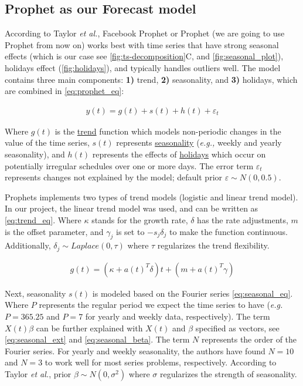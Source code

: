 \subsection[Prophet as our Forecast model]{Prophet as our Forecast model}
\label{sec:forecast_model}

According to Taylor \textit{et al.}\autocite{taylor2018forecasting}, Facebook Prophet or Prophet (we are going to use Prophet from now on)  works best with time series that have strong seasonal effects (which is our case see \autoref{fig:ts-decomposition}C, and \autoref{fig:seasonal_plot}), holidays effect (\autoref{fig:holidays}), and typically handles outliers well. The model contains three main components: \textbf{1)} trend, \textbf{2)} seasonality, and \textbf{3)} holidays, which are combined in \autoref{eq:prophet_eq}:

\begin{align}\label{eq:prophet_eq}
y(t)= g(t) + s(t) + h(t) + \varepsilon_t  
\end{align}

Where $g(t)$ is the \underline{trend} function which models non-periodic changes in the value of the time series, $s(t)$ represents \underline{seasonality} (\textit{e.g.,} weekly and yearly seasonality), and $h(t)$ represents the effects of \underline{holidays} which occur on potentially irregular schedules over one or more days. The error term $\varepsilon_t$ represents changes not explained by the model; default prior $\varepsilon \sim N(0,0.5)$.

Prophets implements two types of trend models (logistic and linear trend model). In our project, the linear trend model was used, and can be written as \autoref{eq:trend_eq}. Where $\kappa$ stands for the growth rate, $\delta$ has the rate adjustments, $m$ is the offset parameter, and $\gamma_j$ is set to $-s_j\delta_j$ to make the function continuous. Additionally, $\delta_j \sim Laplace(0,\tau)$  where $\tau$ regularizes the trend flexibility.  

\begin{align}\label{eq:trend_eq}
g(t)= (\kappa + a(t)^T\delta)t + (m + a(t)^T\gamma)
\end{align}  

Next, seasonality $s(t)$ is modeled based on the Fourier series \autoref{eq:seasonal_eq}. Where $P$ represents the regular period we expect the time series to have (\textit{e.g.} $P=365.25$ and $P=7$ for yearly and weekly data, respectively). The term $X(t)\beta$ can be further explained with $X(t)$ and $\beta$ specified as vectors, see \autoref{eq:seasonal_ext} and \autoref{eq:seasonal_beta}. The term $N$ represents the order of the Fourier series. For yearly and weekly seasonality, the authors have found $N = 10$ and $N = 3$ to work well for most series problems, respectively. According to Taylor \textit{et al.}, prior $\beta \sim N(0,\sigma^2)$ where $\sigma$ regularizes the strength of seasonality.

